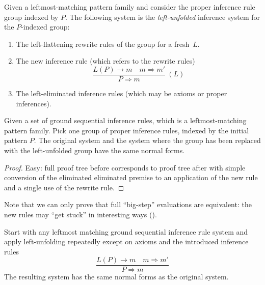 \documentclass[11pt]{article} %
\begin{document}
\begin{definition}
  Given a leftmost-matching pattern family and consider the proper inference rule group indexed by
  $P$. The following system is the \emph{left-unfolded} inference system for the $P$-indexed group:
  \begin{enumerate}

  \item The left-flattening rewrite rules of the group for a fresh~$L$.

  \item The new inference rule (which refers to the rewrite rules)
    \begin{displaymath}
      \dfrac{ L(P) → m \quad m ⇒ m' }{ P ⇒ m } ~ (L)
    \end{displaymath}

  \item The left-eliminated inference rules (which may be axioms or proper inferences).

  \end{enumerate}
\end{definition}

\begin{proposition}
  Given a set of ground sequential inference rules, which is a leftmost-matching pattern
  family. Pick one group of proper inference rules, indexed by the initial pattern $P$. The original
  system and the system where the group has been replaced with the left-unfolded group have the same
  normal forms.
\end{proposition}
\begin{proof}
  Easy: full proof tree before corresponds to proof tree after with simple conversion of the
  eliminated eliminated premise to an application of the new rule and a single use of the rewrite
  rule.
\end{proof}

Note that we can only prove that full ``big-step'' evaluations are equivalent: the new rules may
``get stuck'' in interesting ways ().

\begin{lemma}
  Start with any leftmost matching ground sequential inference rule system and apply left-unfolding
  repeatedly except on axioms and the introduced inference rules
  \begin{displaymath}
    \dfrac{ L(P) → m \quad m ⇒ m' }{ P ⇒ m }
  \end{displaymath}
  The resulting system has the same normal forms as the original system.
\end{lemma}
\end{document}
